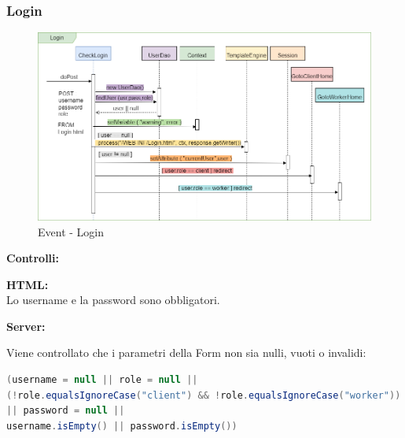 \documentclass[a4paper, 12pt]{article}
\begin{document}
\subsubsection{Login}
\begin{figure}[h!]
	\centering
	\includegraphics[width=1\textwidth]{PureHTML_images/Login.png}
	\caption{Event - Login}
	\label{figure:login_sd}
\end{figure}
\noindent \textbf{Controlli:}

\noindent \textbf{HTML:} \\ Lo username e la password sono obbligatori.

\noindent \textbf{Server:} 

\noindent Viene controllato che i parametri della Form non sia nulli, vuoti o invalidi:

\begin{lstlisting}[language=java] 
(username = null || role = null || 
(!role.equalsIgnoreCase("client") && !role.equalsIgnoreCase("worker")) 
|| password = null || 
username.isEmpty() || password.isEmpty())
\end{lstlisting}
\end{document}
